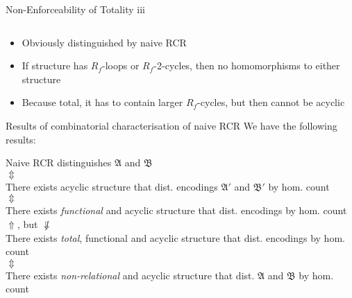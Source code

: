 \documentclass[aspectratio=169]{beamer}
\begin{document}
\begin{frame}{Non-Enforceability of Totality iii}
\begin{columns}
			\begin{column}{0.25\textwidth}
				\centering
			\end{column}
		\end{columns}
		\begin{itemize}
			\item Obviously distinguished by naive RCR
			\item If structure has $R_f$-loops or $R_f$-2-cycles, then no homomorphisms to either structure
			\item Because total, it has to contain larger $R_f$-cycles, but then cannot be acyclic
		\end{itemize}
	\end{frame}
	
	\begin{frame}{Results of combinatorial characterisation of naive RCR}
		We have the following results:
		\begin{center}
			Naive RCR distinguishes $\mathfrak A$ and $\mathfrak B$\\
			$\Updownarrow$\\
			There exists acyclic structure that dist. encodings $\mathfrak A'$ and $\mathfrak B'$ by hom. count\\
			$\Updownarrow$\\
			There exists \emph{functional} and acyclic structure that dist. encodings by hom. count\\
			$\Uparrow$, but $\not\Downarrow$\\
			There exists \emph{total}, functional and acyclic structure that dist. encodings by hom. count\\
			$\Updownarrow$\\
			There exists \emph{non-relational} and acyclic structure that dist. $\mathfrak A$ and $\mathfrak B$ by hom. count
		\end{center}
	\end{frame}
	
\end{document}
